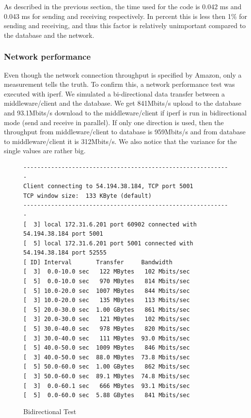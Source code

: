 \documentclass[milestone1.tex]{subfiles}
\begin{document}
As described in the previous section, the time used for the code is 0.042 ms and 0.043 ms for sending and receiving respectively. In percent this is less then 1\% for sending and receiving, and thus this factor is relatively unimportant compared to the database and the network.

\subsubsection{Network performance}

Even though the network connection throughput is specified by Amazon, only a measurement tells the truth. To confirm this, a network performance test was executed with iperf. We simulated a bi-directional data transfer between a middleware/client and the database. We get 841Mbits/s upload to the database and 93.1Mbits/s download to the middleware/client if iperf is run in bidirectional mode (send and receive in parallel). If only one direction is used, then the throughput from middleware/client to database is 959Mbits/s and from database to middleware/client it is 312Mbits/s. We also notice that the variance for the single values are rather big.\\

\begin{figure}[H]
\begin{center}
\begin{verbatim}
------------------------------------------------------------
Client connecting to 54.194.38.184, TCP port 5001
TCP window size:  133 KByte (default)
------------------------------------------------------------
[  3] local 172.31.6.201 port 60902 connected with 54.194.38.184 port 5001
[  5] local 172.31.6.201 port 5001 connected with 54.194.38.184 port 52555
[ ID] Interval       Transfer     Bandwidth
[  3]  0.0-10.0 sec   122 MBytes   102 Mbits/sec
[  5]  0.0-10.0 sec   970 MBytes   814 Mbits/sec
[  5] 10.0-20.0 sec  1007 MBytes   844 Mbits/sec
[  3] 10.0-20.0 sec   135 MBytes   113 Mbits/sec
[  5] 20.0-30.0 sec  1.00 GBytes   861 Mbits/sec
[  3] 20.0-30.0 sec   121 MBytes   102 Mbits/sec
[  5] 30.0-40.0 sec   978 MBytes   820 Mbits/sec
[  3] 30.0-40.0 sec   111 MBytes  93.0 Mbits/sec
[  5] 40.0-50.0 sec  1009 MBytes   846 Mbits/sec
[  3] 40.0-50.0 sec  88.0 MBytes  73.8 Mbits/sec
[  5] 50.0-60.0 sec  1.00 GBytes   862 Mbits/sec
[  3] 50.0-60.0 sec  89.1 MBytes  74.8 Mbits/sec
[  3]  0.0-60.1 sec   666 MBytes  93.1 Mbits/sec
[  5]  0.0-60.0 sec  5.88 GBytes   841 Mbits/sec
\end{verbatim}
\end{center}
\caption{Bidirectional Test}
\label{fig:iperfclient}
\end{figure}
\end{document}
